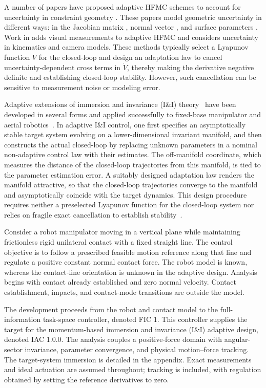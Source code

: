 \documentclass[10pt,journal,letterpaper]{IEEEtran}
\begin{document}
A number of papers have proposed adaptive HFMC schemes to account for uncertainty in constraint geometry \cite{NamAgh05,KarDou09,PliArt15,CheSlo10}. These papers model geometric uncertainty in different ways: in the Jacobian matrix \cite{NamAgh05}, normal vector \cite{KarDou09}, and surface parameters \cite{PliArt15}. Work in \cite{CheSlo10} adds visual measurements to adaptive HFMC and considers uncertainty in kinematics and camera models. These methods typically select a Lyapunov function $V$ for the closed-loop and design an adaptation law to cancel uncertainty-dependent cross terms in $\dot{V}$, thereby making the derivative negative definite and establishing closed-loop stability. However, such cancellation can be sensitive to measurement noise or modeling error.

Adaptive extensions of immersion and invariance (I\&I) theory~\cite{AstOrt03} have been developed in several forms and applied successfully to fixed-base manipulator and aerial robotics~\cite{KarAst08,SeoAke09,astolfi2008nonlinear,HuZha13,FujYokTan10,ZhaXiaZha15}. In adaptive I\&I control, one first specifies an asymptotically stable target system evolving on a lower-dimensional invariant manifold, and then constructs the actual closed-loop by replacing unknown parameters in a nominal non-adaptive control law with their estimates. The off-manifold coordinate, which measures the distance of the closed-loop trajectories from this manifold, is tied to the parameter estimation error. A suitably designed adaptation law renders the manifold attractive, so that the closed-loop trajectories converge to the manifold and asymptotically coincide with the target dynamics. This design procedure requires neither a preselected Lyapunov function for the closed-loop system nor relies on fragile exact cancellation to establish stability~\cite{AstOrtVen10,ThaSriAke15}.

Consider a robot manipulator moving in a vertical plane while maintaining frictionless rigid unilateral contact with a fixed straight line. The control objective is to follow a prescribed feasible motion reference along that line and regulate a positive constant normal contact force. The robot model is known, whereas the contact-line orientation is unknown in the adaptive design. Analysis begins with contact already established and zero normal velocity. Contact establishment, impacts, and contact-mode transitions are outside the model.

The development proceeds from the robot and contact model to the full-information task-space controller, denoted FIC 1. This controller supplies the target for the momentum-based immersion and invariance (I\&I) adaptive design, denoted IAC 1.0.0. The analysis couples a positive-force domain with angular-sector invariance, parameter convergence, and physical motion--force tracking. The target-system immersion is detailed in the appendix. Exact measurements and ideal actuation are assumed throughout; tracking is included, with regulation obtained by setting the reference derivatives to zero.
\end{document}
